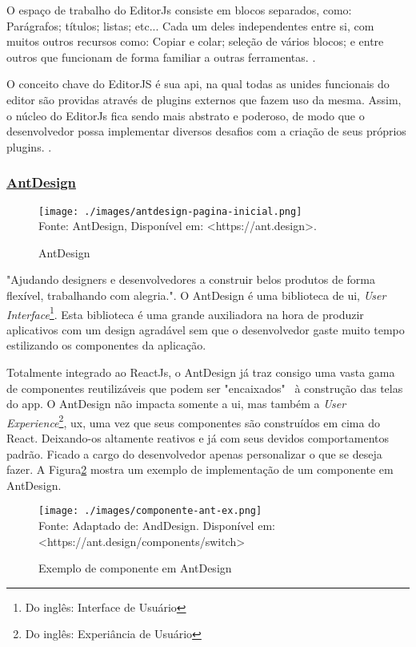 O espaço de trabalho do EditorJs consiste em blocos separados, como:
Parágrafos; títulos; listas; etc... Cada um deles independentes entre si,
com muitos outros recursos como: Copiar e colar; seleção de vários blocos;
e entre outros que funcionam de forma familiar a outras ferramentas.
\cite{editorjs}.

O conceito chave do EditorJS é sua \acrshort{api}, na qual
todas as unides funcionais do editor são providas através de plugins externos que fazem
uso da mesma. Assim, o núcleo do EditorJs fica sendo mais abstrato e poderoso, de
modo que o desenvolvedor possa implementar diversos desafios com a criação
de seus próprios plugins.
\cite{editorjs}.

\subsubsection{\underline{AntDesign}}

\begin{figure}[H]
    \centering
    \caption{AntDesign}
    \texttt{[image: ./images/antdesign-pagina-inicial.png]}
    \label{fig:antdesign-pagina-inicial} \\
    \textnormal{\fontsize{10pt}{12pt}Fonte: AntDesign, Disponível em: <https://ant.design>.}
\end{figure}

"Ajudando designers e desenvolvedores a construir belos produtos de forma flexível, trabalhando com alegria.".
O AntDesign é uma biblioteca de
\acrshort{ui},
\textit{User Interface}\footnote{Do inglês: Interface de Usuário
}.
Esta biblioteca é uma grande auxiliadora na hora de produzir aplicativos
com um design agradável sem que o desenvolvedor gaste muito tempo
estilizando os componentes da aplicação.

Totalmente integrado ao ReactJs, o AntDesign já traz consigo uma vasta
gama de componentes reutilizáveis que podem ser "encaixados"~ à
construção das telas do app.
O AntDesign não impacta somente a
\acrshort{ui},
mas também a
\textit{User Experience}\footnote{Do inglês: Experiância de Usuário
},
\acrshort{ux}, uma vez que seus componentes são construídos
em cima do React. Deixando-os altamente reativos e já com seus
devidos comportamentos padrão. Ficado a cargo do desenvolvedor
apenas personalizar o que se deseja fazer.
A
Figura\ref{fig:componente-ant-ex}
mostra um exemplo de implementação de um componente em AntDesign.

\begin{figure}[H]
    \centering
    \caption{Exemplo de componente em AntDesign}
    \texttt{[image: ./images/componente-ant-ex.png]}
    \label{fig:componente-ant-ex} \\
    \textnormal{\fontsize{10pt}{12pt}Fonte: Adaptado de: AndDesign. Disponível em: <https://ant.design/components/switch>}
\end{figure}

